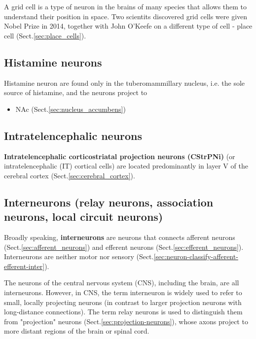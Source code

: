 A grid cell is a type of neuron in the brains of many species that allows them
to understand their position in space. Two scientits discovered grid cells were
given Nobel Prize in 2014, together with John O'Keefe on a different type of
cell - place cell (Sect.\ref{sec:place_cells}).




\subsection{Histamine neurons}
\label{sec:histamine-neurons}

Histamine neuron are found only in the tuberomammillary nucleus, i.e. the sole
source of histamine, and the neurons project to 
\begin{itemize}
  \item NAc (Sect.\ref{sec:nucleus_accumbens})
\end{itemize}


\subsection{Intratelencephalic neurons}
\label{sec:Intratelencephalic-neurons}

{\bf Intratelencephalic corticostriatal projection neurons (CStrPNi)} (or
intratelencephalic (IT) cortical cells) are located predominantly in layer V of
the cerebral cortex (Sect.\ref{sec:cerebral_cortex}).
\subsection{Interneurons (relay neurons, association neurons, local circuit
neurons)}
\label{sec:interneurons}
\label{sec:relay-neurons}


Broadly speaking, {\bf interneurons} are neurons that connects afferent neurons
(Sect.\ref{sec:afferent_neurons}) and efferent neurons
(Sect.\ref{sec:efferent_neurons}). Interneurons are neither motor nor sensory
(Sect.\ref{sec:neuron-classify-afferent-efferent-inter}).

The neurons of the central nervous system (CNS), including the brain, are all
interneurons. However, in CNS, the term interneuron is widely used to refer to
small, locally projecting neurons (in contrast to larger projection neurons with
long-distance connections).
The term  relay neurons is used to distinguish them from "projection" neurons
(Sect.\ref{sec:projection-neurons}), whose axons project to more distant regions
of the brain or spinal cord.

